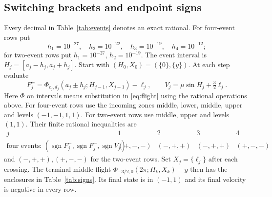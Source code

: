 \documentclass[11pt,a4paper]{article}
\begin{document}
\subsection{Switching brackets and endpoint signs}
Every decimal in Table~\ref{tab:events} denotes an exact rational.
For four-event rows put
\[
 h_1=10^{-27},\quad h_2=10^{-22},\quad
 h_3=10^{-19},\quad h_4=10^{-12};
\]
for two-event rows put $h_1=10^{-27}$, $h_2=10^{-19}$.
The event interval is $H_j=[a_j-h_j,a_j+h_j]$.
Start with $(H_0,X_0)=(\{0\},\{y\})$. At each step evaluate
\[
 F_j^\pm=\Phi_{c_j,d_j}(a_j\pm h_j;H_{j-1},X_{j-1})-\ell_j,
 \qquad V_j=\mu\sin H_j+\tfrac32\ell_j.
\]
Here $\Phi$ on intervals means substitution in \eqref{eq:flight} using
the rational operations above. For four-event rows use the incoming
zones middle, lower, middle, upper and levels $(-1,-1,1,1)$.
For two-event rows use middle, upper and levels $(1,1)$.
Their finite rational inequalities are
\[
\begin{array}{c|cccc}
j&1&2&3&4\\\hline
\text{four events: }(\operatorname{sgn}F_j^-,\operatorname{sgn}F_j^+,
 \operatorname{sgn}V_j)&(+,-,-)&(-,+,+)&(-,+,+)&(+,-,-)
\end{array}
\]
and $(-,+,+),(+,-,-)$ for the two-event rows.
Set $X_j=\{\ell_j\}$ after each crossing. The terminal middle flight
$\Phi_{-3/2,0}(2\pi;H_k,X_k)-y$ then has the enclosures in
Table~\ref{tab:signs}. Its final state is in $(-1,1)$ and its final
velocity is negative in every row.
\end{document}
